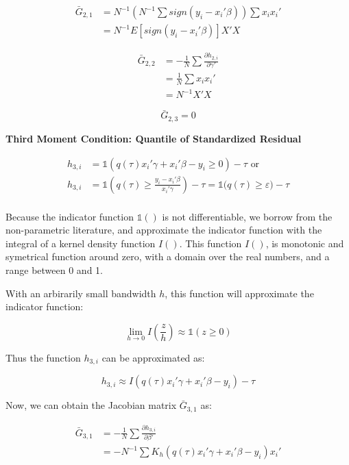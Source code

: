 \documentclass[
  authoryear,
  review,
  1p]{elsarticle}
\begin{document}
\[\begin{aligned}
\bar G_{2,1} &= N^{-1} \left(N^{-1}\sum sign(y_i-x_i'\beta)\right) \sum x_i x_i' \\
&= N^{-1} E[sign(y_i-x_i'\beta)] X'X
\end{aligned}
\]

\[\begin{aligned}
\bar G_{2,2} &= -\frac{1}{N} \sum \frac{\partial h_{2,i}}{\partial \gamma'} \\
             &=  \frac{1}{N} \sum x_i x_i' \\
             &= N^{-1} X'X
\end{aligned}
\]

\[\bar G_{2,3}=0\]

\textbf{Third Moment Condition: Quantile of Standardized Residual}

\[\begin{aligned}
h_{3,i} &= \mathbb{1}\left(q(\tau) x_i'\gamma +x_i'\beta - y_i \geq 0 \right) - \tau \text{ or}\\
h_{3,i} &= \mathbb{1}\left( q(\tau)  \geq \frac{y_i- x_i'\beta}{x_i'\gamma}  \right) - \tau = \mathbb{1}\big( q(\tau)  \geq \varepsilon  \big) - \tau \\
\end{aligned}
\]

Because the indicator function \(\mathbb{1}()\) is not differentiable,
we borrow from the non-parametric literature, and approximate the
indicator function with the integral of a kernel density function
\(I()\). This function \(I()\), is monotonic and symetrical function
around zero, with a domain over the real numbers, and a range between 0
and 1.

With an arbirarily small bandwidth \(h\), this function will approximate
the indicator function:

\[
\lim_{h\rightarrow 0} I\left(\frac{z}{h}\right) \approx \mathbb{1}(z\geq 0)
\]

Thus the function \(h_{3,i}\) can be approximated as:

\[h_{3,i} \approx I\left( q(\tau) x_i'\gamma +x_i'\beta - y_i  \right) - \tau\]

Now, we can obtain the Jacobian matrix \(\bar G_{3,1}\) as:

\[\begin{aligned}
\bar G_{3,1} &= -\frac{1}{N} \sum \frac{\partial h_{3,i}}{\partial \beta'} \\
             &= -N^{-1} \sum K_h(q(\tau) x_i'\gamma +x_i'\beta - y_i ) x_i'
\end{aligned}
\]
\end{document}
